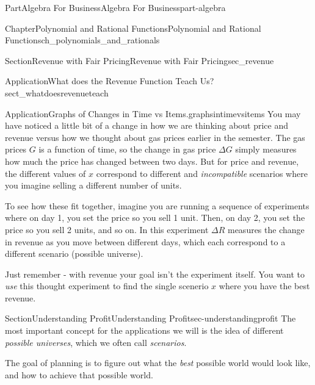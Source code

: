 \documentclass{tufte-book}
\numberwithin{equation}{chapter}
\def \tikzhistogram (#1,#2){\draw[fill=blue,opacity=0.3] ({#1+((\xtwo-\xmin)/5)},#2) rectangle ({#1-((\xtwo-\xmin)/5)},0); \draw[draw,thick] ({#1+((\xtwo-\xmin)/5)},#2) rectangle ({#1-((\xtwo-\xmin)/5)},0); \node[draw,fill=blue, circle,inner sep=2.5pt] at (#1,#2) {};}
\begin{document}
\begin{partptx}{Part}{Algebra For Business}{}{Algebra For Business}{}{}{part-algebra}
\begin{chapterptx}{Chapter}{Polynomial and Rational Functions}{}{Polynomial and Rational Functions}{}{}{ch_polynomials_and_rationals}
\begin{sectionptx}{Section}{Revenue with Fair Pricing}{}{Revenue with Fair Pricing}{}{}{sec_revenue}
\begin{insight}{Application}{What does the Revenue Function Teach Us?}{sect_whatdoesrevenueteach}
\begin{image}{0}{1}{0}{}
{
}%
\end{image}%
\end{insight}
\begin{insight}{Application}{Graphs of Changes in Time vs Items.}{graphsintimevsitems}%
You may have noticed a little bit of a change in how we are thinking about price and revenue versus how we thought about gas prices earlier in the semester. The gas prices \(G\) is a function of time, so the change in gas price \(\Delta G\) simply measures how much the price has changed between two days. But for price and revenue, the different values of \(x\) correspond to different and \emph{incompatible} scenarios where you imagine selling a different number of units.%
\par
To see how these fit together, imagine you are running a sequence of experiments where on day 1, you set the price so you sell 1 unit. Then, on day 2, you set the price so you sell 2 units, and so on. In this experiment \(\Delta R\) measures the change in revenue as you move between different days, which each correspond to a different scenario (possible universe).%
\par
Just remember - with revenue your goal isn't the experiment itself. You want to \emph{use} this thought experiment to find the single scenerio \(x\) where you have the best revenue.%
\end{insight}
\end{sectionptx}
%
%
\typeout{************************************************}
\typeout{************************************************}
%
\begin{sectionptx}{Section}{Understanding Profit}{}{Understanding Profit}{}{}{sec-understandingprofit}
The most important concept for the applications we will is the idea of different \emph{possible universes}, which we often call \emph{scenarios}.%
\par
The goal of planning is to figure out what the \emph{best} possible world would look like, and how to achieve that possible world.%

\end{sectionptx}
\end{chapterptx}
\end{partptx}
\end{document}
